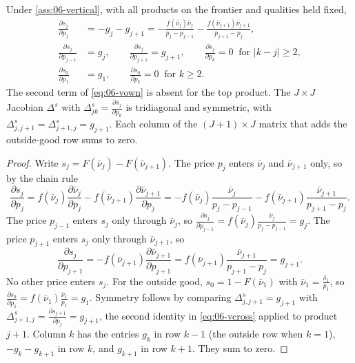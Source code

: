 \begin{proposition}\label{prop:06-vderiv}
Under \cref{ass:06-vertical}, with all products on the frontier and qualities held fixed,
\begin{align}
  \frac{\partial s_j}{\partial p_j} &= -g_j - g_{j+1}
     = -\frac{f(\bar\nu_j)\bar\nu_j}{p_j - p_{j-1}} - \frac{f(\bar\nu_{j+1})\bar\nu_{j+1}}{p_{j+1} - p_j}, \label{eq:06-vown}\\
  \frac{\partial s_j}{\partial p_{j-1}} &= g_j, \qquad \frac{\partial s_j}{\partial p_{j+1}} = g_{j+1}, \qquad
  \frac{\partial s_j}{\partial p_k} = 0 \ \text{ for } |k - j| \ge 2, \label{eq:06-vcross}\\
  \frac{\partial s_0}{\partial p_1} &= g_1, \qquad \frac{\partial s_0}{\partial p_k} = 0 \ \text{ for } k \ge 2.
  \label{eq:06-voutside}
\end{align}
The second term of \eqref{eq:06-vown} is absent for the top product. The $J \times J$ Jacobian $\Delta^s$ with
$\Delta^s_{jk} = \frac{\partial s_j}{\partial p_k}$ is tridiagonal and symmetric, with
$\Delta^s_{j,j+1} = \Delta^s_{j+1,j} = g_{j+1}$. Each column of the $(J+1) \times J$ matrix that adds the outside-good
row sums to zero.
\end{proposition}

\begin{proof}
Write $s_j = F(\bar\nu_j) - F(\bar\nu_{j+1})$. The price $p_j$ enters $\bar\nu_j$ and $\bar\nu_{j+1}$ only, so by the
chain rule
\begin{equation*}
  \frac{\partial s_j}{\partial p_j} = f(\bar\nu_j)\frac{\partial\bar\nu_j}{\partial p_j} - f(\bar\nu_{j+1})\frac{\partial\bar\nu_{j+1}}{\partial p_j}
  = -f(\bar\nu_j)\frac{\bar\nu_j}{p_j - p_{j-1}} - f(\bar\nu_{j+1})\frac{\bar\nu_{j+1}}{p_{j+1} - p_j}.
\end{equation*}
The price $p_{j-1}$ enters $s_j$ only through $\bar\nu_j$, so $\frac{\partial s_j}{\partial p_{j-1}} =
f(\bar\nu_j)\frac{\bar\nu_j}{p_j - p_{j-1}} = g_j$. The price $p_{j+1}$ enters $s_j$ only through $\bar\nu_{j+1}$,
so
\begin{equation*}
  \frac{\partial s_j}{\partial p_{j+1}} = -f(\bar\nu_{j+1})\frac{\partial\bar\nu_{j+1}}{\partial p_{j+1}}
  = f(\bar\nu_{j+1})\frac{\bar\nu_{j+1}}{p_{j+1} - p_j} = g_{j+1}.
\end{equation*}
No other price enters $s_j$. For the outside good, $s_0 = 1 - F(\bar\nu_1)$ with $\bar\nu_1 = \frac{\delta_1}{p_1}$,
so $\frac{\partial s_0}{\partial p_1} = f(\bar\nu_1)\frac{\bar\nu_1}{p_1} = g_1$. Symmetry follows by comparing
$\Delta^s_{j,j+1} = g_{j+1}$ with $\Delta^s_{j+1,j} = \frac{\partial s_{j+1}}{\partial p_j} = g_{j+1}$, the second identity
in \eqref{eq:06-vcross} applied to product $j+1$. Column $k$ has the entries $g_k$ in row $k - 1$ (the outside
row when $k = 1$), $-g_k - g_{k+1}$ in row $k$, and $g_{k+1}$ in row $k + 1$. They sum to zero.
\end{proof}

